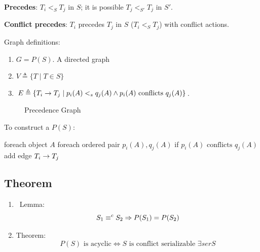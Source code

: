 \documentclass[a4paper]{report}
\begin{document}
\textbf{Precedes}: $T_i <_S T_j$ in $S$; it is possible $T_j <_{S'} T_j$ in $S'$.

\textbf{Conflict precedes}: $T_i$ precedes $T_j$ in $S$ ($T_i <_S T_j$) with conflict actions.

Graph definitions:
\begin{enumerate}
\item $G = P(S)$. A directed graph
\item $V \triangleq \{T\mid T\in S\}$
\item $E \triangleq \{T_i \rightarrow T_j\mid p_i(A) <_s q_j(A) \wedge p_i(A)  \text{ conflicts } q_j(A)\}$.
\end{enumerate}
\begin{figure}[hbtp]
\centering
{}
\caption{Precedence Graph}
\label{fig:precdnGraph}
\end{figure}
To construct a $P(S)$:
\begin{pseudo}
foreach object $A$
  foreach ordered pair $p_i(A), q_j(A)$
    if $p_i(A) \text{ conflicts } q_j(A)$
      add edge $T_i \rightarrow T_j$
\end{pseudo}
\subsection{Theorem}
\begin{enumerate}
\item\ Lemma:
$$S_1 \equiv^c S_2 \Rightarrow P(S_1)=P(S_2)$$
\item Theorem:
$$P(S) \text{ is acyclic} \Leftrightarrow S \text{ is conflict serializable } \exists serS$$
\end{enumerate}
\end{document}
